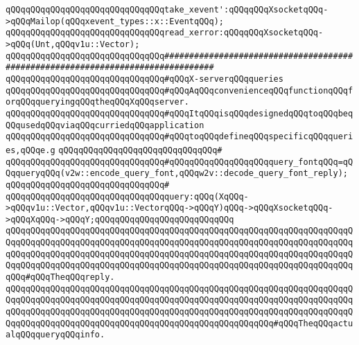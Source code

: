 \newline
\newline
\verb|qQQqqQQqqQQqqQQqqQQqqQQqqQQqqQQqtake_xevent':qQQqqQQqXsocketqQQq->qQQqMailop(qQQqxevent_types::x::EventqQQq);|\newline
\newline
\verb|qQQqqQQqqQQqqQQqqQQqqQQqqQQqqQQqread_xerror:qQQqqQQqXsocketqQQq->qQQq(Unt,qQQqv1u::Vector);|\newline
\newline
\newline
\newline
\verb|qQQqqQQqqQQqqQQqqQQqqQQqqQQqqQQq################################################################################|\newline
\verb|qQQqqQQqqQQqqQQqqQQqqQQqqQQqqQQq#qQQqX-serverqQQqqueries|\newline
\newline
\verb|qQQqqQQqqQQqqQQqqQQqqQQqqQQqqQQq#qQQqAqQQqconvenienceqQQqfunctionqQQqforqQQqqueryingqQQqtheqQQqXqQQqserver.|\newline
\verb|qQQqqQQqqQQqqQQqqQQqqQQqqQQqqQQq#qQQqItqQQqisqQQqdesignedqQQqtoqQQqbeqQQqusedqQQqviaqQQqcurriedqQQqapplication|\newline
\verb|qQQqqQQqqQQqqQQqqQQqqQQqqQQqqQQq#qQQqtoqQQqdefineqQQqspecificqQQqqueries,qQQqe.g|\newline
\verb|qQQqqQQqqQQqqQQqqQQqqQQqqQQqqQQq#|\newline
\verb|qQQqqQQqqQQqqQQqqQQqqQQqqQQqqQQq#qQQqqQQqqQQqqQQqqQQqquery_fontqQQq=qQQqqueryqQQq(v2w::encode_query_font,qQQqw2v::decode_query_font_reply);|\newline
\verb|qQQqqQQqqQQqqQQqqQQqqQQqqQQqqQQq#|\newline
\verb|qQQqqQQqqQQqqQQqqQQqqQQqqQQqqQQqquery:qQQq(XqQQq->qQQqv1u::Vector,qQQqv1u::VectorqQQq->qQQqY)qQQq->qQQqXsocketqQQq->qQQqXqQQq->qQQqY;qQQqqQQqqQQqqQQqqQQqqQQqqQQq|\newline
\verb|qQQqqQQqqQQqqQQqqQQqqQQqqQQqqQQqqQQqqQQqqQQqqQQqqQQqqQQqqQQqqQQqqQQqqQQqqQQqqQQqqQQqqQQqqQQqqQQqqQQqqQQqqQQqqQQqqQQqqQQqqQQqqQQqqQQqqQQqqQQqqQQqqQQqqQQqqQQqqQQqqQQqqQQqqQQqqQQqqQQqqQQqqQQqqQQqqQQqqQQqqQQqqQQqqQQqqQQqqQQqqQQqqQQqqQQqqQQqqQQqqQQqqQQqqQQqqQQqqQQqqQQqqQQqqQQqqQQqqQQqqQQq#qQQqTheqQQqreply.|\newline
\verb|qQQqqQQqqQQqqQQqqQQqqQQqqQQqqQQqqQQqqQQqqQQqqQQqqQQqqQQqqQQqqQQqqQQqqQQqqQQqqQQqqQQqqQQqqQQqqQQqqQQqqQQqqQQqqQQqqQQqqQQqqQQqqQQqqQQqqQQqqQQqqQQqqQQqqQQqqQQqqQQqqQQqqQQqqQQqqQQqqQQqqQQqqQQqqQQqqQQqqQQqqQQqqQQqqQQqqQQqqQQqqQQqqQQqqQQqqQQqqQQqqQQqqQQqqQQqqQQqqQQqqQQq#qQQqTheqQQqactualqQQqqueryqQQqinfo.|\newline
